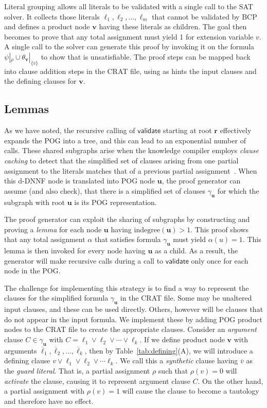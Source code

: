 \documentclass[letterpaper,USenglish,cleveref, autoref, thm-restate]{lipics-v2021}
\newcommand{\obar}[1]{\overline{#1}}
\newcommand{\lit}{\ell}
\newcommand{\assign}{\alpha}
\newcommand{\passign}{\rho}
\newcommand{\indegree}{\textrm{indegree}}
\newcommand{\validate}{\textsf{validate}}
\newcommand{\makenode}[1]{\mathbf{#1}}
\newcommand{\nodeu}{\makenode{u}}
\newcommand{\nodev}{\makenode{v}}
\newcommand{\noder}{\makenode{r}}
\newcommand{\simplify}[2]{#1|_{#2}}
\begin{document}
Literal grouping allows all literals to be validated with a single call to the SAT solver.
It collects those literals
$\lit_1, \lit_2, \ldots, \lit_m$ that cannot be validated by BCP and defines a
product node $\nodev$ having these literals as children.  The goal
then becomes to prove that any total assignment must yield 1 for extension
variable $v$.  A single call to the solver can generate this proof by invoking it on the formula
  $\simplify{\psi}{\passign} \cup \simplify{\theta_{\nodev}}{\{ \obar{v} \}}$ to show that is unsatisfiable.
  The proof steps can be mapped back into clause addition steps in the CRAT file, using as hints the
  input clauses and the defining clauses for $\nodev$.


\subsection{Lemmas}
\label{app:lemma}

As we have noted, the recursive calling of $\validate$ starting at
root $\noder$ effectively expands the POG into a tree, and this can
lead to an exponential number of calls.  
These shared subgraphs arise when the knowledge compiler employs {\em clause caching}
to detect that the simplified set of
clauses arising from one partial assignment to the literals matches that
of a previous partial assignment~\cite{darwiche:aaai:2002}.
When this d-DNNF node is translated into POG
node $\nodeu$, the proof generator can assume (and also check), that
there is a simplified set of clauses $\gamma_{\nodeu}$
for which the subgraph with root $\nodeu$ is its POG representation.

The proof generator can exploit the sharing of subgraphs
by constructing and proving a {\em lemma} for each node
$\nodeu$ having $\indegree(\nodeu) > 1$.  This proof shows that any
total assignment $\assign$ that satisfies formula $\gamma_{\nodeu}$ must yield
$\assign(u) = 1$.  This lemma is then invoked for every node having
$\nodeu$ as a child.  As a result, the generator will make recursive calls during a call to $\validate$ only once for each node in the POG\@.


The challenge for implementing this strategy is to find a way to
represent the clauses for the simplified formula $\gamma_{\nodeu}$ in the CRAT file.  Some may be
unaltered input clauses, and these can be used directly.  Others,
however will be clauses that do not appear in the input formula.  We
implement these by adding POG product nodes to the CRAT file to create
the appropriate clauses.  Consider an {\em argument} clause
$C \in \gamma_{\nodeu}$ with $C = \lit_1 \lor \lit_2 \lor \cdots \lor \lit_k$.  If we
define product node $\nodev$ with arguments
$\obar{\lit}_1, \obar{\lit}_2, \ldots, \obar{\lit}_k$, then by
Table~\ref{tab:defining}(A), we will introduce a defining clause
$v \lor \lit_1 \lor \lit_2 \lor \cdots \lit_k$.  We call this a {\em
  synthetic} clause having $\obar{v}$ as the {\em guard literal}.
That is, a partial assignment $\passign$ such that $\passign(v) = 0$ will {\em
  activate} the clause, causing it to represent argument clause $C$.  On the other
hand, a partial assignment with $\passign(v) = 1$ will
cause the clause to become a tautology and therefore have no effect.
\end{document}
